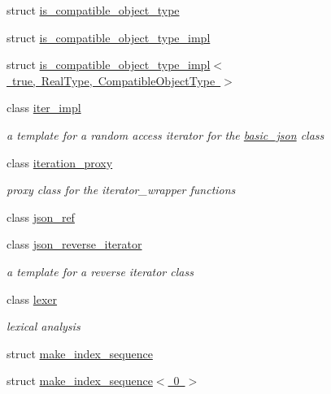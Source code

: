 \begin{DoxyCompactItemize}
\item 
struct \mbox{\hyperlink{structnlohmann_1_1detail_1_1is__compatible__object__type}{is\+\_\+compatible\+\_\+object\+\_\+type}}
\item 
struct \mbox{\hyperlink{structnlohmann_1_1detail_1_1is__compatible__object__type__impl}{is\+\_\+compatible\+\_\+object\+\_\+type\+\_\+impl}}
\item 
struct \mbox{\hyperlink{structnlohmann_1_1detail_1_1is__compatible__object__type__impl_3_01true_00_01_real_type_00_01_compatible_object_type_01_4}{is\+\_\+compatible\+\_\+object\+\_\+type\+\_\+impl$<$ true, Real\+Type, Compatible\+Object\+Type $>$}}
\item 
class \mbox{\hyperlink{classnlohmann_1_1detail_1_1iter__impl}{iter\+\_\+impl}}
\begin{DoxyCompactList}\small\item\em a template for a random access iterator for the \mbox{\hyperlink{classnlohmann_1_1basic__json}{basic\+\_\+json}} class \end{DoxyCompactList}\item 
class \mbox{\hyperlink{classnlohmann_1_1detail_1_1iteration__proxy}{iteration\+\_\+proxy}}
\begin{DoxyCompactList}\small\item\em proxy class for the iterator\+\_\+wrapper functions \end{DoxyCompactList}\item 
class \mbox{\hyperlink{classnlohmann_1_1detail_1_1json__ref}{json\+\_\+ref}}
\item 
class \mbox{\hyperlink{classnlohmann_1_1detail_1_1json__reverse__iterator}{json\+\_\+reverse\+\_\+iterator}}
\begin{DoxyCompactList}\small\item\em a template for a reverse iterator class \end{DoxyCompactList}\item 
class \mbox{\hyperlink{classnlohmann_1_1detail_1_1lexer}{lexer}}
\begin{DoxyCompactList}\small\item\em lexical analysis \end{DoxyCompactList}\item 
struct \mbox{\hyperlink{structnlohmann_1_1detail_1_1make__index__sequence}{make\+\_\+index\+\_\+sequence}}
\item 
struct \mbox{\hyperlink{structnlohmann_1_1detail_1_1make__index__sequence_3_010_01_4}{make\+\_\+index\+\_\+sequence$<$ 0 $>$}}
\item 

\end{DoxyCompactItemize}
